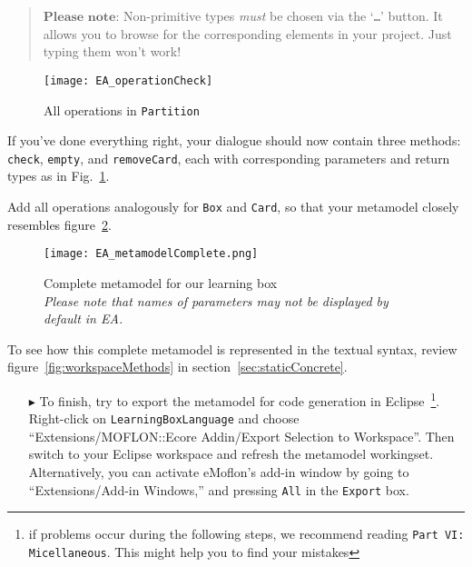 \vspace{-.5cm}
\begin{quote}
$\textbf{Please note:}$ Non-primitive types \emph{must} be chosen via the `\texttt{\ldots}' button. It allows you to browse for the corresponding elements in your project. Just typing them won't work!
\end{quote}


\begin{figure}[htbp]
	\centering
  \texttt{[image: EA\_operationCheck]}
	\caption{All operations in \texttt{Partition}}
	\label{fig:operation_partition}
\end{figure}

If you've done everything right, your dialogue should now contain three methods: \texttt{check}, \texttt{empty}, and \texttt{removeCard}, each with corresponding parameters and return types as in Fig.~\ref{fig:operation_partition}.

Add all operations analogously for \texttt{Box} and \texttt{Card}, so that your metamodel closely resembles figure~\ref{fig:metamodel_complete}.

\begin{figure}[htbp]
	\centering
  \texttt{[image: EA\_metamodelComplete.png]}
	\caption[Complete metamodel for our learning box.]{Complete metamodel for our learning box \\ \emph{\small Please note that names of parameters may not be displayed by default in EA.}}
	\label{fig:metamodel_complete}
\end{figure}

\pagebreak

To see how this complete metamodel is represented in the textual syntax, review figure~\ref{fig:workspaceMethods} in section~\ref{sec:staticConcrete}.

\begin{enumerate}
\item[$\blacktriangleright$] To finish, try to export the metamodel for code generation in Eclipse~\footnote{if problems occur during the following steps, we recommend reading \texttt{Part VI: Micellaneous}. This might help you to find your mistakes}. Right-click on \texttt{LearningBoxLanguage} and choose ``Extensions/MOFLON::Ecore Addin/Export Selection to Workspace''.
Then switch to your Eclipse work\-space and refresh the metamodel workingset. Alternatively, you can activate eMoflon's add-in window by going to ``Extensions/Add-in Windows,'' and pressing \texttt{All} in the \texttt{Export} box.
\end{enumerate}


